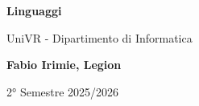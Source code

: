 \begin{titlepage}
	\begin{center}
		\vspace*{1cm}

		\Huge
		\textbf{Linguaggi}

		\vspace{0.5cm}
		\LARGE
		UniVR - Dipartimento di Informatica

		\vspace{1.5cm}

		\textbf{Fabio Irimie, Legion}

		\vfill


		\vspace{0.8cm}


		2° Semestre 2025/2026

	\end{center}
\end{titlepage}
